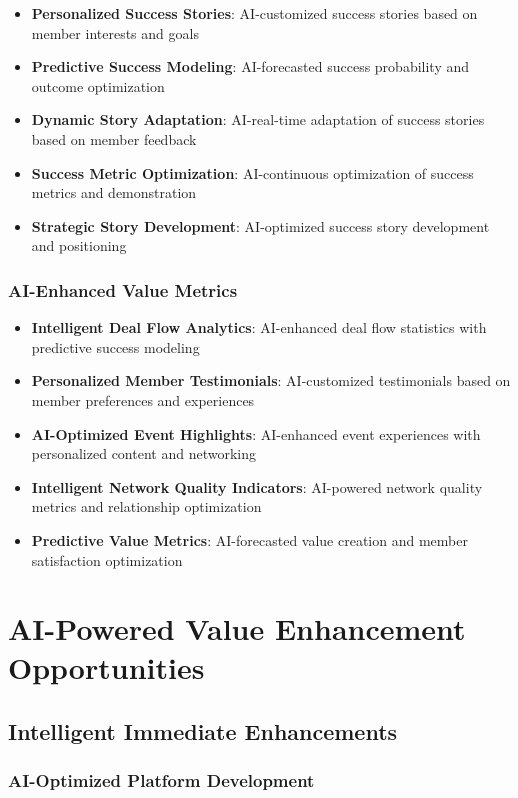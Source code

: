 \begin{itemize}
    \item \textbf{Personalized Success Stories}: AI-customized success stories based on member interests and goals
    \item \textbf{Predictive Success Modeling}: AI-forecasted success probability and outcome optimization
    \item \textbf{Dynamic Story Adaptation}: AI-real-time adaptation of success stories based on member feedback
    \item \textbf{Success Metric Optimization}: AI-continuous optimization of success metrics and demonstration
    \item \textbf{Strategic Story Development}: AI-optimized success story development and positioning
\end{itemize}

\subsubsection{AI-Enhanced Value Metrics}

\begin{itemize}
    \item \textbf{Intelligent Deal Flow Analytics}: AI-enhanced deal flow statistics with predictive success modeling
    \item \textbf{Personalized Member Testimonials}: AI-customized testimonials based on member preferences and experiences
    \item \textbf{AI-Optimized Event Highlights}: AI-enhanced event experiences with personalized content and networking
    \item \textbf{Intelligent Network Quality Indicators}: AI-powered network quality metrics and relationship optimization
    \item \textbf{Predictive Value Metrics}: AI-forecasted value creation and member satisfaction optimization
\end{itemize}

\section{AI-Powered Value Enhancement Opportunities}

\subsection{Intelligent Immediate Enhancements}

\subsubsection{AI-Optimized Platform Development}

